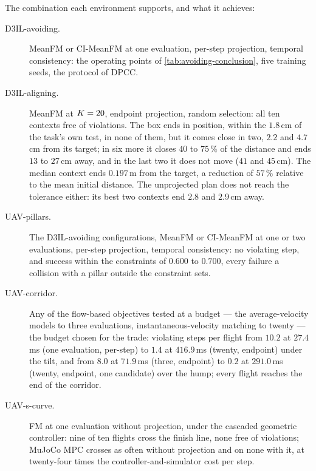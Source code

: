 The combination each environment supports, and what it achieves:

\begin{description}
  \item[D3IL-avoiding.] MeanFM or CI-MeanFM at one evaluation, per-step projection, temporal consistency:
    the operating points of \autoref{tab:avoiding-conclusion}, five training seeds, the protocol of \ac{DPCC}.
  \item[D3IL-aligning.] MeanFM at $K=20$, endpoint projection, random selection: all ten contexts
    free of violations. The box ends in position, within the $1.8$\,cm of the task's own test, in none of
    them, but it comes close in two, $2.2$ and $4.7$\,cm from its target; in six more it closes $40$ to
    $75\,\%$ of the distance and ends $13$ to $27$\,cm away, and in the last two it does not move ($41$ and
    $45$\,cm). The median context ends $0.197$\,m from the target, a reduction of $57\,\%$ relative to the mean initial
    distance.
    The unprojected plan does not reach the tolerance either: its best two contexts end $2.8$ and $2.9$\,cm
    away.
  \item[UAV-pillars.] The D3IL-avoiding configurations, MeanFM or CI-MeanFM at one or two evaluations,
    per-step projection, temporal consistency: no violating step, and success within the constraints of
    $0.600$ to $0.700$, every failure a collision with a pillar outside the constraint sets.
  \item[UAV-corridor.] Any of the flow-based objectives tested at a budget --- the average-velocity models to
    three evaluations, instantaneous-velocity matching to twenty --- the budget chosen for the trade:
    violating steps per flight
    from $10.2$ at $27.4$\,ms (one evaluation, per-step) to $1.4$ at $416.9$\,ms (twenty, endpoint) under the
    tilt, and from $8.0$ at $71.9$\,ms (three, endpoint) to $0.2$ at $291.0$\,ms (twenty, endpoint, one
    candidate) over the hump; every flight reaches the end of the corridor.
  \item[UAV-s-curve.] FM at one evaluation without projection, under the cascaded geometric controller: nine
    of ten flights cross the finish line, none free of violations; MuJoCo MPC crosses as often without
    projection and on none with it, at twenty-four times the controller-and-simulator cost per step.
\end{description}
